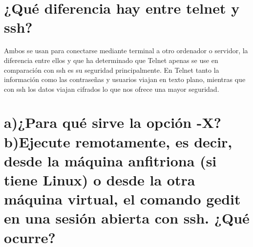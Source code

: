 \section[Cuestión 4]{¿Qué diferencia hay entre telnet y ssh?}

Ambos se usan para conectarse mediante terminal a otro ordenador o servidor, la diferencia entre ellos y que ha determinado que Telnet apenas se use en comparación con ssh es su seguridad principalmente. En Telnet tanto la información como las contraseñas y usuarios viajan en texto plano, mientras que con ssh los datos viajan cifrados lo que nos ofrece una mayor seguridad. \cite{SSH}

\section[Cuestión 5]{a)¿Para qué sirve la opción -X? b)Ejecute remotamente, es decir, desde la máquina anfitriona (si tiene Linux) o desde la otra máquina	virtual, el comando	gedit en una sesión abierta con ssh. ¿Qué ocurre?}

